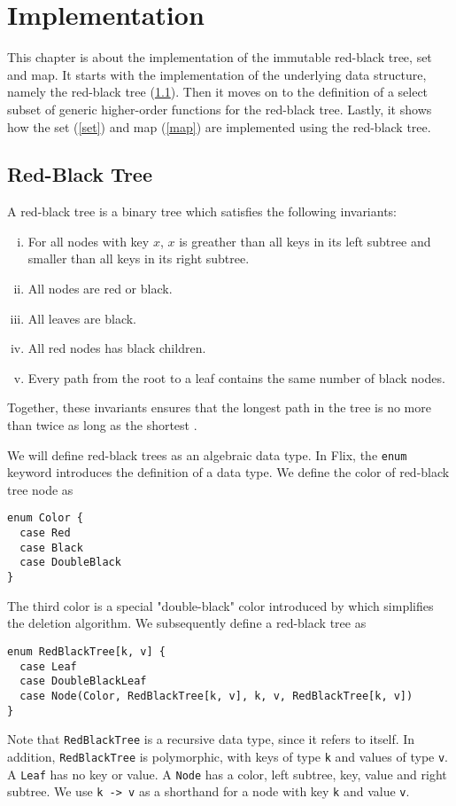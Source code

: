 \documentclass[../main.tex]{subfiles}
\begin{document}
\chapter{Implementation} \label{implementation}

This chapter is about the implementation of the immutable red-black tree, set and map. It starts with the implementation of the underlying data structure, namely the red-black tree (\ref{red-black-tree}). Then it moves on to the definition of a select subset of generic higher-order functions for the red-black tree. Lastly, it shows how the set (\ref{set}) and map (\ref{map}) are implemented using the red-black tree.

\section{Red-Black Tree} \label{red-black-tree}

A red-black tree is a binary tree which satisfies the following invariants:
\begin{enumerate}[(i)]
  \item For all nodes with key $x$, $x$ is greather than all keys in its left subtree and smaller than all keys in its right subtree.
  \item All nodes are red or black.
  \item All leaves are black.
  \item All red nodes has black children.
  \item Every path from the root to a leaf contains the same number of black nodes.
\end{enumerate}
Together, these invariants ensures that the longest path in the tree is no more than twice as long as the shortest \citep{cormen-et-al-2009}.

We will define red-black trees as an algebraic data type. In Flix, the \lstinline{enum} keyword introduces the definition of a data type. We define the color of red-black tree node as
\begin{lstlisting}[language=Flix]
enum Color {
  case Red
  case Black
  case DoubleBlack
}
\end{lstlisting}
The third color is a special "double-black" color introduced by \citet{germane-matthew-2014} which simplifies the deletion algorithm. We subsequently define a red-black tree as
\begin{lstlisting}[language=Flix]
enum RedBlackTree[k, v] {
  case Leaf
  case DoubleBlackLeaf
  case Node(Color, RedBlackTree[k, v], k, v, RedBlackTree[k, v])
}
\end{lstlisting}
Note that \lstinline{RedBlackTree} is a recursive data type, since it refers to itself. In addition, \lstinline{RedBlackTree} is polymorphic, with keys of type \lstinline{k} and values of type \lstinline{v}. A \lstinline{Leaf} has no key or value. A \lstinline{Node} has a color, left subtree, key, value and right subtree. We use \lstinline{k -> v} as a shorthand for a node with key \lstinline{k} and value \lstinline{v}.
\end{document}
